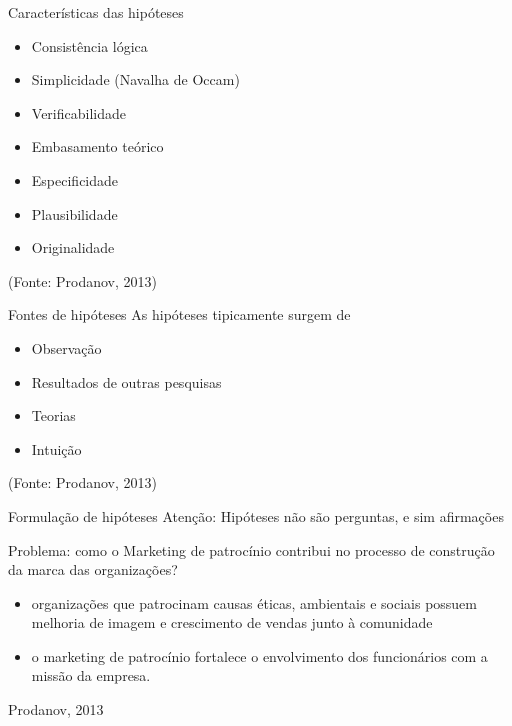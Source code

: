 \documentclass{beamer}
\begin{document}
\begin{frame}{Características das hipóteses}
  \begin{itemize}
  \item Consistência lógica
  \item Simplicidade (Navalha de Occam)
  \item Verificabilidade
  \item Embasamento teórico
  \item Especificidade
  \item Plausibilidade
  \item Originalidade
  \end{itemize}
  (Fonte: Prodanov, 2013)
\end{frame}

\begin{frame}{Fontes de hipóteses}
  As hipóteses tipicamente surgem de
  \begin{itemize}
  \item Observação
  \item Resultados de outras pesquisas
  \item Teorias
  \item Intuição
  \end{itemize}
  (Fonte: Prodanov, 2013)
\end{frame}


\begin{frame}{Formulação de hipóteses}
Atenção: Hipóteses não são perguntas, e sim afirmações

\begin{example}
  Problema: como o Marketing de patrocínio contribui no processo de
  construção da marca das organizações?

  \begin{itemize}
  \item organizações que patrocinam causas éticas, ambientais e
    sociais possuem melhoria de imagem e crescimento de vendas junto à
    comunidade
  \item o marketing de patrocínio fortalece o envolvimento dos
    funcionários com a missão da empresa.
  \end{itemize}
  Prodanov, 2013
\end{example}
\end{frame}

\end{document}
